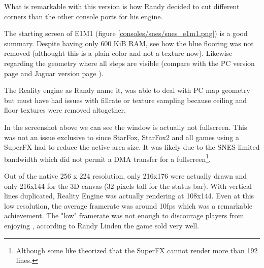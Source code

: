 What is remarkable with this version is how Randy decided to cut different corners than the other console ports for his engine.\\
\par
{}
\par
The starting screen of E1M1 (figure \ref{consoles/snes/snes_e1m1.png}) is a good summary. Despite having only 600 KiB RAM, see how the blue flooring was not removed (althought this is a plain color and not a texture now). Likewise regarding the geometry where all steps are visible (compare with the PC version page \pageref{mashed_potatoes1.png} and Jaguar version page \pageref{doom_jaguar3.png}).\\
\par The Reality engine as Randy name it, was able to deal with PC map geometry but must have had issues with fillrate or texture sampling because ceiling and floor textures were removed altogether.













\par
In the screenshot above we can see the window is actually not fullscreen. This was not an issue exclusive to \doom since StarFox, StarFox2 and all games using a SuperFX had to reduce the active area size. It was likely due to the SNES limited bandwidth which did not permit a DMA transfer for a fullscreen\footnote{Although some like  theorized that the SuperFX cannot render more than 192 lines.}.\\
\par
Out of the native 256 x 224 resolution, only 216x176 were actually drawn and only 216x144 for the 3D canvas (32 pixels tall for the status bar). With vertical lines duplicated, Reality Engine was actually rendering at 108x144. Even at this low resolution, the average framerate was around 10fps which was a remarkable achievement. The "low" framerate was not enough to discourage players from enjoying \doom, according to Randy Linden the game sold very well.







